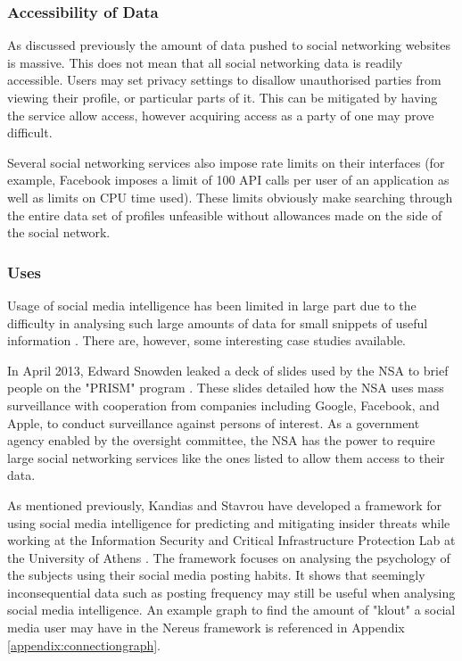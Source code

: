 \documentclass{article}
\begin{document}
\subsubsection{Accessibility of Data}
As discussed previously the amount of data pushed to social networking websites is massive. This does not mean that all social networking data is readily accessible. Users may set privacy settings to disallow unauthorised parties from viewing their profile, or particular parts of it. This can be mitigated by having the service allow access, however acquiring access as a party of one may prove difficult.

Several social networking services also impose rate limits on their interfaces (for example, Facebook imposes a limit of 100 API calls per user of an application as well as limits on CPU time used). These limits obviously make searching through the entire data set of profiles unfeasible without allowances made on the side of the social network. 

\subsubsection{Uses}
Usage of social media intelligence has been limited in large part due to the difficulty in analysing such large amounts of data for small snippets of useful information \citep{socmintoverview}. There are, however, some interesting case studies available.

In April 2013, Edward Snowden leaked a deck of slides used by the NSA to brief people on the "PRISM" program \citep{prismslides}. These slides detailed how the NSA uses mass surveillance with cooperation from companies including Google, Facebook, and Apple, to conduct surveillance against persons of interest. As a government agency enabled by the oversight committee, the NSA has the power to require large social networking services like the ones listed to allow them access to their data.

As mentioned previously, Kandias and Stavrou have developed a framework for using social media intelligence for predicting and mitigating insider threats while working at the Information Security and Critical Infrastructure Protection Lab at the University of Athens \citep{behaviourdetection}. The framework focuses on analysing the psychology of the subjects using their social media posting habits. It shows that seemingly inconsequential data such as posting frequency may still be useful when analysing social media intelligence. An example graph to find the amount of "klout" a social media user may have in the Nereus framework is referenced in Appendix \ref{appendix:connectiongraph}.
\end{document}
